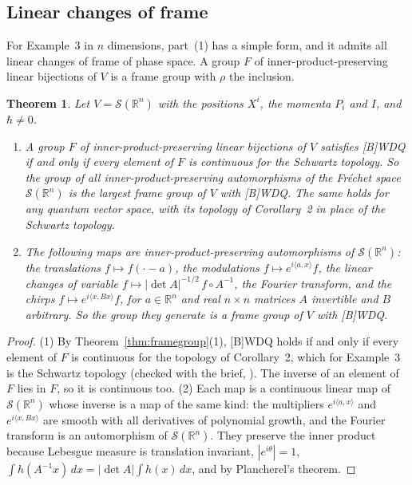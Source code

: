 \documentclass[11pt]{article}
\newtheorem{theorem}{Theorem}[section]
\theoremstyle{definition}
\begin{document}
\subsection{Linear changes of frame}
\label{sec:linearframes}

For Example~3 in $n$ dimensions, part~(1) has a simple form, and it admits all linear changes of
frame of phase space. A group $F$ of inner-product-preserving linear bijections of $V$ is a frame
group with $\rho$ the inclusion.

\begin{theorem}\label{thm:linearframes}
  Let $V = \mathcal S(\mathbb R^n)$ with the positions $X^i$, the momenta $P_i$ and $I$, and
  $\hbar \ne 0$.
  \begin{enumerate}
    \item A group $F$ of inner-product-preserving linear bijections of $V$ satisfies [B]WDQ if and
      only if every element of $F$ is continuous for the Schwartz topology. So the group of all
      inner-product-preserving automorphisms of the Fréchet space $\mathcal S(\mathbb R^n)$ is the
      largest frame group of $V$ with [B]WDQ. The same holds for any quantum vector space, with
      its topology of Corollary~2 in place of the Schwartz topology.
    \item The following maps are inner-product-preserving automorphisms of
      $\mathcal S(\mathbb R^n)$: the translations $f \mapsto f(\cdot - a)$, the modulations
      $f \mapsto e^{i\langle a, x\rangle}f$, the linear changes of variable
      $f \mapsto |\det A|^{-1/2}\, f \circ A^{-1}$, the Fourier transform, and the chirps
      $f \mapsto e^{i\langle x, Bx\rangle} f$, for $a \in \mathbb R^n$ and real $n \times n$
      matrices $A$ invertible and $B$ arbitrary. So the group they generate is a frame group of
      $V$ with [B]WDQ.
  \end{enumerate}
\end{theorem}

\begin{proof}
  (1) By Theorem~\ref{thm:framegroup}(1), [B]WDQ holds if and only if every element of $F$ is
  continuous for the topology of Corollary~2, which for Example~3 is the Schwartz topology
  (checked with the brief, ). The inverse of an
  element of $F$ lies in $F$, so it is continuous too. (2) Each map is a continuous linear map of
  $\mathcal S(\mathbb R^n)$ whose inverse is a map of the same kind: the multipliers
  $e^{i\langle a, x\rangle}$ and $e^{i\langle x, Bx\rangle}$ are smooth with all derivatives of
  polynomial growth, and the Fourier transform is an automorphism of $\mathcal S(\mathbb R^n)$.
  They preserve the inner product because Lebesgue measure is translation invariant,
  $|e^{i\theta}| = 1$, $\int h(A^{-1}x)\,dx = |\det A|\int h(x)\,dx$, and by Plancherel's theorem.
\end{proof}
\end{document}
